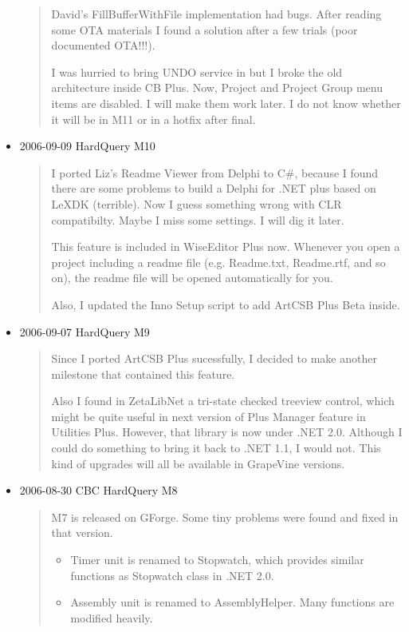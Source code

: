 \begin{itemize}
\begin{quotation}
    David's FillBufferWithFile implementation had bugs. After reading some
    OTA materials I found a solution after a few trials (poor documented
    OTA!!!).

    I was hurried to bring UNDO service in but I broke the old architecture
    inside CB Plus. Now, Project and Project Group menu items are disabled.
    I will make them work later. I do not know whether it will be in M11 or
    in a hotfix after final.
  \end{quotation}

  \item 2006-09-09 HardQuery M10
  \begin{quotation}
    I ported Liz's Readme Viewer from Delphi to C\#, because I found there
    are some problems to build a Delphi for .NET plus based on LeXDK
    (terrible). Now I guess something wrong with CLR compatibilty. Maybe I
    miss some settings. I will dig it later.

    This feature is included in WiseEditor Plus now. Whenever you open a
    project including a readme file (e.g. Readme.txt, Readme.rtf, and so
    on), the readme file will be opened automatically for you.

    Also, I updated the Inno Setup script to add ArtCSB Plus Beta inside.
  \end{quotation}

  \item 2006-09-07 HardQuery M9
  \begin{quotation}
    Since I ported ArtCSB Plus sucessfully, I decided to make another
    milestone that contained this feature.

    Also I found in ZetaLibNet a tri-state checked treeview control, which
    might be quite useful in next version of Plus Manager feature in
    Utilities Plus. However, that library is now under .NET 2.0. Although I
    could do something to bring it back to .NET 1.1, I would not. This kind
    of upgrades will all be available in GrapeVine versions.
  \end{quotation}

  \item 2006-08-30 CBC HardQuery M8
  \begin{quotation}
    M7 is released on GForge. Some tiny problems were found and fixed in
    that version.
    \begin{itemize}
      \item Timer unit is renamed to Stopwatch, which provides similar functions as
      Stopwatch class in .NET 2.0.
      \item Assembly unit is renamed to AssemblyHelper. Many functions are modified
      heavily.
    \end{itemize}


\end{quotation}
\end{itemize}
